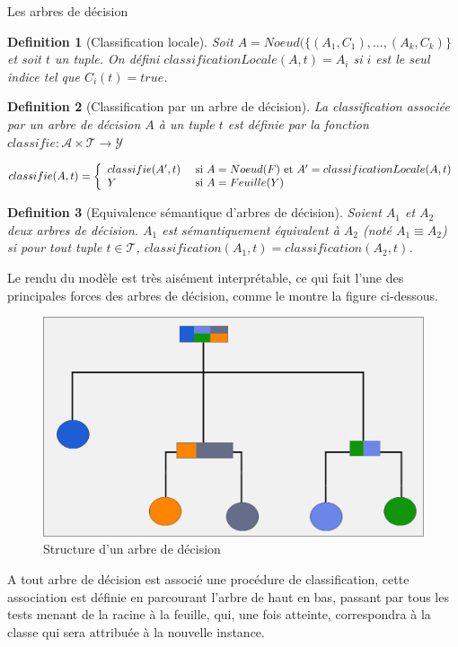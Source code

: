 \documentclass[a4paper, 11pt]{report}
\newtheorem{definition}{Definition}
\newcommand{\tupleset}{\ensuremath{\mathcal{T}}}
\newcommand{\arbreset}{\ensuremath{\mathcal{A}}}
\newcommand{\classeset}{\ensuremath{\mathcal{Y}}}
\begin{document}
\begin{chapter}{Les arbres de décision}
\begin{definition}[Classification locale]
  Soit $A=Noeud(\{(A_1,C_1),\dots,(A_k,C_k)\}$ et soit $t$ un tuple.
  On défini $classificationLocale(A,t)=A_i$ si $i$ est le seul indice tel que $C_i(t)=true$.
\end{definition}


\begin{definition}[Classification par un arbre de décision]
  La classification associée par un arbre de décision $A$ à un tuple $t$ est définie par la fonction $classifie:\arbreset\times\tupleset\rightarrow\classeset$

  $$classifie(A,t)=\left\{
    \begin{array}[c]{ll}
      classifie(A',t)&\textnormal{ si }A=Noeud(F)\textnormal{ et }A' = classificationLocale(A,t)\\
      Y&\textnormal{ si }A=Feuille(Y)
    \end{array}
  \right.
  $$
\end{definition}

\begin{definition}[Equivalence sémantique d'arbres de décision]
  Soient $A_1$ et $A_2$ deux arbres de décision. $A_1$ est sémantiquement équivalent à $A_2$ (noté $A_1\equiv A_2$) si pour tout tuple $t\in\tupleset$, $classification(A_1,t) = classification(A_2,t)$.
\end{definition}

Le rendu du modèle est très aisément interprétable, ce qui fait l'une des principales forces des arbres de décision, comme le montre la figure ci-dessous.

\begin{figure}[!h]
\begin{center}
	\includegraphics[scale=2]{Images/arbreD.png}
	\caption{Structure d'un arbre de décision}
\end{center}
\label{Arbre}
\end{figure}
A tout arbre de décision est associé une procédure de classification, cette association est définie en parcourant l'arbre de haut en bas, passant par tous les tests menant de la racine à la feuille, qui, une fois atteinte, correspondra à la classe qui sera attribuée à la nouvelle instance.


\end{chapter}
\end{document}
